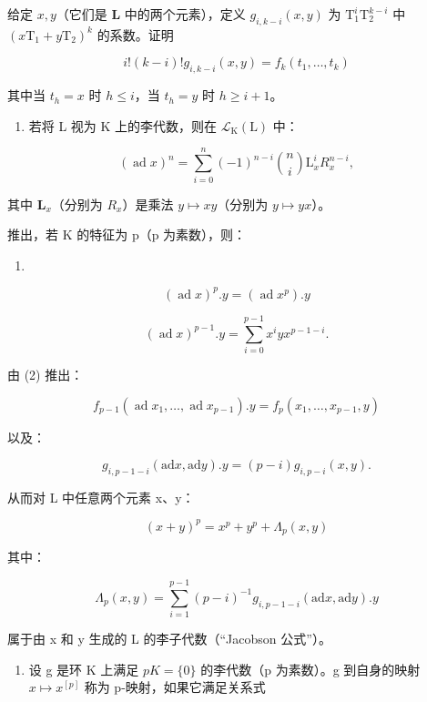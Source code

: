   给定 \(x, y\)（它们是 \(\mathbf{L}\) 中的两个元素），定义 \(g_{i,k-i}(x,y)\) 为 \(\mathrm{T}_1^i\mathrm{T}_2^{k - i}\) 中 \((x\mathrm{T}_1 + y\mathrm{T}_2)^k\) 的系数。证明

\[
i! (k - i)! g _ {i, k - i} (x, y) = f _ {k} \left(t _ {1}, \dots , t _ {k}\right)
\]

其中当 \(t_h = x\) 时 \(h \leqslant i\)，当 \(t_h = y\) 时 \(h \geqslant i + 1\)。

\begin{enumerate}
\def\labelenumi{(\alph{enumi})}
\setcounter{enumi}{1}
\tightlist
\item
  若将 L 视为 K 上的李代数，则在 \(\mathcal{L}_{\mathrm{K}}(\mathrm{L})\) 中：
\end{enumerate}

\[
(\operatorname{ad} x) ^ {n} = \sum_ {i = 0} ^ {n} (- 1) ^ {n - i} \binom {n} {i} \mathrm{L} _ {x} ^ {i} R _ {x} ^ {n - i},
\]

其中 \(\mathbf{L}_x\)（分别为 \(R_{x}\)）是乘法 \(y\mapsto xy\)（分别为 \(y\mapsto yx\)）。

推出，若 K 的特征为 p（p 为素数），则：

\begin{enumerate}
\def\labelenumi{(\arabic{enumi})}
\tightlist
\item
\end{enumerate}

\[
(\operatorname{ad} x) ^ {p}. y = (\operatorname{ad} x ^ {p}). y\tag{2}
\]

\[
(\operatorname{ad} x) ^ {p - 1}. y = \sum_ {i = 0} ^ {p - 1} x ^ {i} y x ^ {p - 1 - i}.
\]

由 (2) 推出：

\[
f _ {p - 1} (\operatorname{ad} x _ {1}, \dots , \operatorname{ad} x _ {p - 1}). y = f _ {p} (x _ {1}, \dots , x _ {p - 1}, y)
\]

以及：

\[
g _ {i, p - 1 - i} (\mathrm{ad} x, \mathrm{ad} y). y = (p - i) g _ {i, p - i} (x, y).
\]

从而对 L 中任意两个元素 x、y：

\[
(x + y) ^ {p} = x ^ {p} + y ^ {p} + \Lambda_ {p} (x, y)\tag{3}
\]

其中：

\[
\Lambda_ {p} (x, y) = \sum_ {i = 1} ^ {p - 1} (p - i) ^ {- 1} g _ {i, p - 1 - i} (\mathrm{ad} x, \mathrm{ad} y). y
\]

属于由 x 和 y 生成的 L 的李子代数（“Jacobson 公式”）。

\begin{enumerate}
\def\labelenumi{\arabic{enumi}.}
\setcounter{enumi}{19}
\tightlist
\item
  设 g 是环 K 上满足 \(pK = \{0\}\) 的李代数（p 为素数）。g 到自身的映射 \(x \mapsto x^{[p]}\) 称为 p-映射，如果它满足关系式
\end{enumerate}

